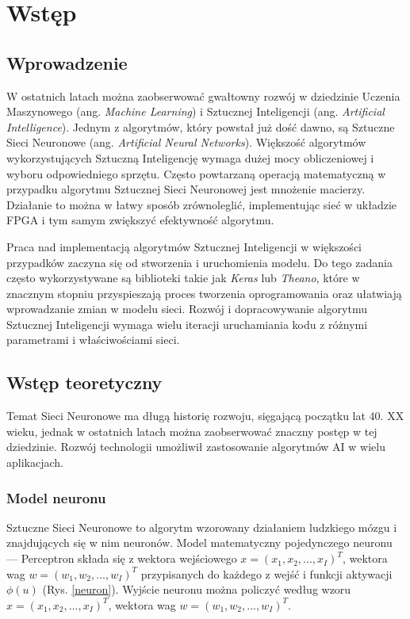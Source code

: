 \newpage %
\cleardoublepage %
\pagestyle{headings}
\section{Wstęp}

\subsection{Wprowadzenie}

W ostatnich latach można zaobserwować gwałtowny rozwój w dziedzinie 
Uczenia Maszynowego (ang. \emph{Machine Learning}) i Sztucznej Inteligencji 
(ang. \emph{Artificial Intelligence}). Jednym z algorytmów, który powstał już 
dość dawno, są Sztuczne Sieci Neuronowe (ang. \emph{Artificial Neural 
Networks}). 
Większość algorytmów wykorzystujących Sztuczną Inteligencję wymaga dużej mocy 
obliczeniowej i wyboru odpowiedniego sprzętu. Często powtarzaną operacją matematyczną 
w przypadku algorytmu Sztucznej Sieci Neuronowej jest mnożenie macierzy.
Działanie to można w łatwy sposób zrównoleglić, implementując sieć w układzie 
FPGA i tym samym zwiększyć efektywność algorytmu.

Praca nad implementacją algorytmów Sztucznej Inteligencji w większości 
przypadków zaczyna się od stworzenia i uruchomienia modelu. Do tego zadania 
często wykorzystywane są biblioteki takie jak \emph{Keras} lub \emph{Theano}, które 
w znacznym stopniu przyspieszają proces tworzenia oprogramowania oraz 
ułatwiają wprowadzanie zmian w modelu sieci. Rozwój i dopracowywanie 
algorytmu Sztucznej Inteligencji wymaga wielu iteracji uruchamiania kodu 
z różnymi parametrami i właściwościami sieci.

\subsection{Wstęp teoretyczny}

Temat Sieci Neuronowe ma długą historię rozwoju, sięgającą początku lat 
40. XX wieku, jednak w ostatnich latach można zaobserwować znaczny postęp w tej 
dziedzinie\cite{Kriesel2007NeuralNetworks}. Rozwój technologii umożliwił zastosowanie
algorytmów AI w wielu aplikacjach. 

\subsubsection{Model neuronu}
Sztuczne Sieci Neuronowe to algorytm wzorowany działaniem ludzkiego mózgu 
i znajdujących się w nim neuronów. Model matematyczny pojedynczego 
neuronu — Perceptron \cite{Omondi2006FPGAIO} składa się z wektora wejściowego 
$x = (x_1, x_2,...,x_I)^T$, wektora wag $w = (w_1, w_2,...,w_I)^T$ 
przypisanych do każdego z wejść i funkcji aktywacji $\phi(u)$ 
(Rys. \ref{neuron}). Wyjście neuronu można policzyć według wzoru
$x = (x_1, x_2,...,x_I)^T$, wektora wag $w = (w_1, w_2,...,w_I)^T$.

